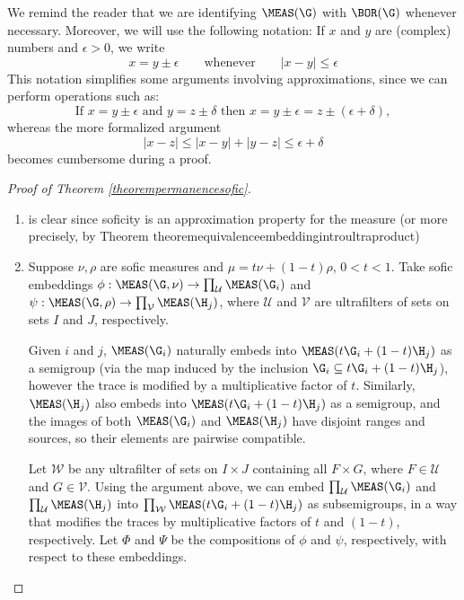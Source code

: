 We remind the reader that we are identifying $\MEAS(\G)$ with $\BOR(\G)$ whenever necessary. Moreover, we will use the following notation: If $x$ and $y$ are (complex) numbers and $\epsilon>0$, we write
\[x=y\pm\epsilon\qquad\text{whenever}\qquad|x-y|\leq\epsilon\]
This notation simplifies some arguments involving approximations, since we can perform operations such as:
\[\text{If }x=y\pm\epsilon\text{ and }y=z\pm\delta\text{ then }x=y\pm\epsilon=z\pm(\epsilon+\delta),\]
whereas the more formalized argument
\[|x-z|\leq|x-y|+|y-z|\leq\epsilon+\delta\]
becomes cumbersome during a proof.

\begin{proof}[Proof of Theorem \ref{theorempermanencesofic}]
\begin{enumerate}
\item[(a)] is clear since soficity is an approximation property for the measure (or more precisely, by Theorem {theoremequivalenceembeddingintroultraproduct})
\item[(b)] Suppose $\nu,\rho$ are sofic measures and $\mu=t\nu+(1-t)\rho$, $0<t<1$. Take sofic embeddings $\phi:\MEAS(\G,\nu)\to\prod_{\mathcal{U}}\MEAS(\G_i)$ and $\psi:\MEAS(\G,\rho)\to\prod_{\mathcal{V}}\MEAS(\H_j)$, where $\mathcal{U}$ and $\mathcal{V}$ are ultrafilters of sets on sets $I$ and $J$, respectively. 

Given $i$ and $j$, $\MEAS(\G_i)$ naturally embeds into $\MEAS(t\G_i+(1-t)\H_j)$ as a semigroup (via the map induced by the inclusion $\G_i\subseteq t\G_i+(1-t)\H_j$), however the trace is modified by a multiplicative factor of $t$. Similarly, $\MEAS(\H_j)$ also embeds into $\MEAS(t\G_i+(1-t)\H_j)$ as a semigroup, and the images of both $\MEAS(\G_i)$ and $\MEAS(\H_j)$ have disjoint ranges and sources, so their elements are pairwise compatible.

Let $\mathcal{W}$ be any ultrafilter of sets on $I\times J$ containing all $F\times G$, where $F\in\mathcal{U}$ and $G\in\mathcal{V}$. Using the argument above, we can embed $\prod_\mathcal{U}\MEAS(\G_i)$ and $\prod_\mathcal{U}\MEAS(\H_j)$ into $\prod_\mathcal{W}\MEAS(t\G_i+(1-t)\H_j)$ as subsemigroups, in a way that modifies the traces by multiplicative factors of $t$ and $(1-t)$, respectively. Let $\Phi$ and $\Psi$ be the compositions of $\phi$ and $\psi$, respectively, with respect to these embeddings.


\end{enumerate}
\end{proof}
